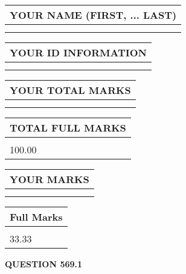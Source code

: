 \documentclass{ctexart}
\begin{document}
   
   
   
\newpage 
\setcounter{page}{ 
   569001 } 
   
   
   
   
\noindent\begin{tabular}{|l|}
\hline
YOUR NAME (FIRST, ... LAST)  \\
\hline
 \\ 
 \\ 
\hline
\end{tabular}
\hspace{0.05in} \begin{tabular}{|l|}
\hline
 YOUR   ID   INFORMATION  \\
\hline
 \\ 
 \\ 
\hline
\end{tabular}
   
   
\vspace{0.2in}\noindent\begin{tabular}{|l|}
\hline
YOUR TOTAL MARKS  \\
\hline
 \\ 
 \\ 
\hline
\end{tabular}
\hspace{0.05in} \begin{tabular}{|l|}
\hline
TOTAL FULL MARKS  \\
\hline
 \\ 
100.00 \\
\hline
\end{tabular}
   
   
 \vspace{0.2in}
 
 
 
 
   
   
  
\vspace{0.2in}
  
\noindent\begin{tabular}{|l|}
\hline
 YOUR MARKS  \\
\hline
 \\ 
 \\ 
\hline
\end{tabular}
\hspace{0.05in} \begin{tabular}{|l|}
\hline
 Full Marks  \\
\hline
 \\ 
33.33 \\
\hline
\end{tabular}
{\textbf{\Large{QUESTION
569.1 
}}}
  
\end{document}
